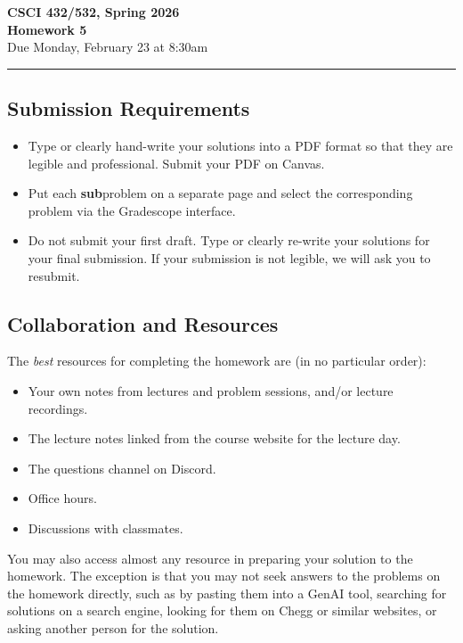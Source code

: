 \documentclass[11pt]{article}
\begin{document}
\begin{center}
\Large\textbf{CSCI 432/532, Spring 2026}%
\\
\LARGE\textbf{Homework 5}%
\\[0.5ex]
\large Due Monday, February 23 at 8:30am
\end{center}

\bigskip
\hrule
\bigskip

\subsection*{Submission Requirements}
\begin{itemize}
    \item Type or clearly hand-write your solutions into a PDF format so that they are legible and professional. Submit your PDF on Canvas. 
	\item Put each \textbf{sub}problem on a separate page and select the corresponding problem via the Gradescope interface.
    \item Do not submit your first draft. Type or clearly re-write your solutions for your final submission. If your submission is not legible, we will ask you to resubmit.
\end{itemize}

\subsection*{Collaboration and Resources}

The \emph{best} resources for completing the homework are (in no particular order):
\begin{itemize}
	\item Your own notes from lectures and problem sessions, and/or lecture recordings.
	\item The lecture notes linked from the course website for the lecture day.
	\item The questions channel on Discord.
	\item Office hours.
	\item Discussions with classmates.
\end{itemize}
You may also access almost any resource in preparing your solution to the
homework. The exception is that you may not seek answers to the problems on the
homework directly, such as by pasting them into a GenAI tool, searching for
solutions on a search engine, looking for them on Chegg or similar websites, or
asking another person for the solution.
\end{document}
